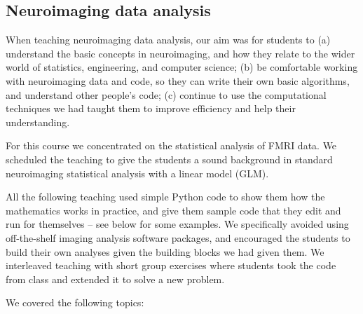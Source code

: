 

\subsection{Neuroimaging data analysis}\label{analysis}

When teaching neuroimaging data analysis, our aim was for students to
(a) understand the basic concepts in neuroimaging,
and how they relate to the wider world of statistics, engineering, and computer science;
(b) be comfortable working with neuroimaging data and code, so they can write
their own basic algorithms, and understand other people's code;
(c) continue to use the computational techniques we had taught them to improve
efficiency and help their understanding.

For this course we concentrated on the statistical analysis of FMRI data.  We
scheduled the teaching to give the students a sound background in standard
neuroimaging statistical analysis with a linear model (GLM).

All the following teaching used simple Python code to show them how the
mathematics works in practice, and give them sample code that they edit and
run for themselves -- see below for some examples.  We specifically avoided
using off-the-shelf imaging analysis software packages, and encouraged the
students to build their own analyses given the building blocks we had given
them.  We interleaved teaching with short group exercises where students took
the code from class and extended it to solve a new problem.

We covered the following topics:

